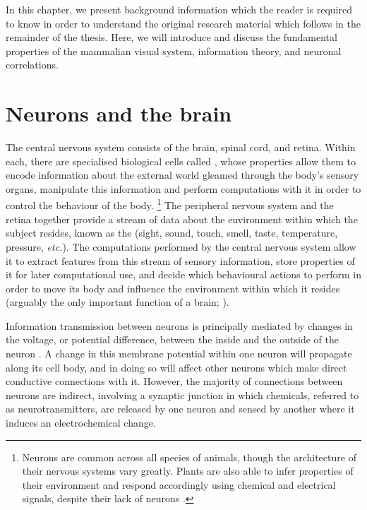 

In this chapter, we present background information which the reader is required to know in order to understand the original research material which follows in the remainder of the thesis.
Here, we will introduce and discuss the fundamental properties of the mammalian visual system, information theory, and neuronal correlations.


\section{Neurons and the brain}

The central nervous system consists of the brain, spinal cord, and retina.
Within each, there are specialised biological cells called , whose properties allow them to encode information about the external world gleamed through the body's sensory organs, manipulate this information and perform computations with it in order to control the behaviour of the body.%
\footnote{
Neurons are common across all species of animals, though the architecture of their nervous systems vary greatly.
Plants are also able to infer properties of their environment and respond accordingly using chemical and electrical signals, despite their lack of neurons \citep{Brenner2006,Barlow2008}.
}
The peripheral nervous system and the retina together provide a stream of data about the environment within which the subject resides, known as the  (sight, sound, touch, smell, taste, temperature, pressure, \textit{etc.}).
The computations performed by the central nervous system allow it to extract features from this stream of sensory information, store properties of it for later computational use, and decide which behavioural actions to perform in order to move its body and influence the environment within which it resides (arguably the only important function of a brain; \citealp{WolpertTED}).

Information transmission between neurons is principally mediated by changes in the voltage, or potential difference, between the inside and the outside of the neuron \citep[Chapter~2]{nsbook}.
A change in this membrane potential within one neuron will propagate along its cell body, and in doing so will affect other neurons which make direct conductive connections with it.
However, the majority of connections between neurons are indirect, involving a synaptic junction in which chemicals, referred to as neurotransmitters, are released by one neuron and sensed by another where it induces an electrochemical change.


